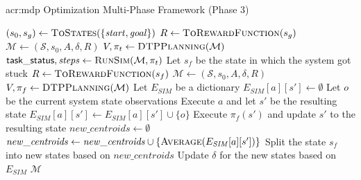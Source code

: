 \begin{algorithm}[t!]
	\caption{\acrshort{acr:mdp} Optimization Multi-Phase Framework (Phase 3)}
	\label{alg:multi-phase-fine-tuning}
	\begin{algorithmic}[1]
		\Statex
		\State $(s_0, s_g) \gets \textproc{ToStates}(\{\mathit{start}, \mathit{goal}\})$
		\State $R \gets \textproc{ToRewardFunction}(s_g)$
		\State $\mathcal{M} \gets (\mathcal{S}, s_0, A, \delta, R)$
		\State $V, \pi_t \gets \textproc{DTPPlanning}(\mathcal{M})$
		\State $\mathsf{task\_status}, \mathit{steps} \gets \textproc{RunSim}(\mathcal{M}, \pi_t)$	
		\State Let $s_f$ be the state in which the system got stuck
		\State $R \gets \textproc{ToRewardFunction}(s_f)$
		\State $\mathcal{M} \gets (\mathcal{S}, s_0, A, \delta, R)$
		\State $V, \pi_f \gets \textproc{DTPPlanning}(\mathcal{M})$
		\State Let $E_\mathit{SIM}$ be a dictionary
			\State $E_\mathit{SIM}[a][s'] \gets \emptyset$
		\EndFor
		 
		\State Let $o$ be the current system state observations
		\State Execute $a$ and let $s'$ be the resulting state
		\State $E_\mathit{SIM}[a][s'] \gets E_\mathit{SIM}[a][s'] \cup \{o\}$	
		 
			\State Execute $\pi_f(s')$ and update $s'$ to the resulting state
		\EndWhile
		\EndFor
		\State $\mathit{new\_centroids} \gets \emptyset$
					\State $\mathit{new\_centroids} \gets \mathit{new\_centroids} \cup \{\textproc{Average}(E_\mathit{SIM}[a][s'])\}$
				\EndFor
			\EndIf
		\EndFor
		\State Split the state $s_f$ into new states based on $\mathit{new\_centroids}$
		\State Update $\delta$ for the new states based on $E_\mathit{SIM}$
		\EndIf
		\EndFor
		\State\Return $\mathcal{M}$
		\EndFunction
	\end{algorithmic}
\end{algorithm}

